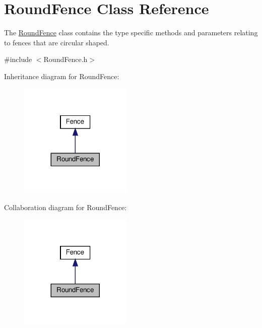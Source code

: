 \hypertarget{class_round_fence}{}\section{Round\+Fence Class Reference}
\label{class_round_fence}


The \hyperlink{class_round_fence}{Round\+Fence} class contains the type specific methods and parameters relating to fences that are circular shaped.  




{\ttfamily \#include $<$Round\+Fence.\+h$>$}



Inheritance diagram for Round\+Fence\+:\nopagebreak
\begin{figure}[H]
\begin{center}
\leavevmode
\includegraphics[width=152pt]{db/df0/class_round_fence__inherit__graph}
\end{center}
\end{figure}


Collaboration diagram for Round\+Fence\+:\nopagebreak
\begin{figure}[H]
\begin{center}
\leavevmode
\includegraphics[width=152pt]{dc/dc1/class_round_fence__coll__graph}
\end{center}
\end{figure}
